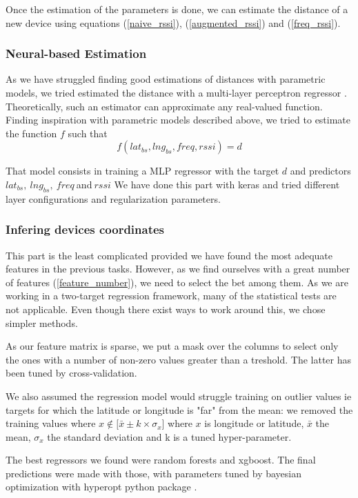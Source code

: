 \documentclass[twocolumn,2pt]{article}
\begin{document}
	Once the estimation of the parameters is done, we can estimate the distance of a new device using equations (\ref{naive_rssi}), (\ref{augmented_rssi}) and (\ref{freq_rssi}).
	
	
	\subsubsection*{Neural-based Estimation} %
	As we have struggled finding good estimations of distances with parametric models, we tried estimated the distance with a multi-layer perceptron regressor \cite{Cybenko1989}. Theoretically, such an estimator can approximate any real-valued function. Finding inspiration with parametric models described above, we tried to estimate the function $f$ such that
	$$ f(lat_{bs}, lng_{bs}, freq, rssi) = d $$
	
	That model consists in training a MLP regressor with the target $d$ and predictors $lat_{bs}, \ lng_{bs}, \ freq \ $and$ \ rssi$ 
	We have done this part with keras and tried different layer configurations and regularization parameters.
	
	
	\subsubsection*{Infering devices coordinates}
	This part is the least complicated provided we have found the most adequate features in the previous tasks. However, as we find ourselves with a great number of features (\ref{feature_number}), we need to select the bet among them. As we are working in a two-target regression framework, many of the statistical tests are not applicable. Even though there exist ways to work around this, we chose simpler methods. 
	
	As our feature matrix is sparse, we put a mask over the columns to select only the ones with a number of non-zero values greater than a treshold. The latter has been tuned by cross-validation.
	
	We also assumed the regression model would struggle training on outlier values ie targets for which the latitude or longitude is "far" from the mean: we removed the training values where $ x \notin \lbrack \bar{x} \pm k \times \sigma_x \rbrack $ where $x$ is longitude or latitude, $\bar{x}$ the mean, $\sigma_x$ the standard deviation and k is a tuned hyper-parameter.
	
	The best regressors we found were random forests and xgboost. The final predictions were made with those, with parameters tuned by bayesian optimization with hyperopt python package \cite{hyperopt}.
	
\end{document}
